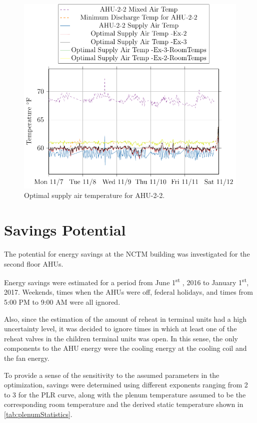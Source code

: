 \begin{figure}
\centering
\includegraphics[]{Plots/2016-11-16-1636-AHU22MixedAirTemp-TikzData.pdf}
\caption{Optimal supply air temperature for AHU-2-2.}
\label{fig:2016-11-16-1636-AHU22MixedAirTemp-TikzData}
\end{figure}

\section{Savings Potential}

The potential for energy savings at the NCTM building was investigated
for the second floor AHUs. 

Energy savings were estimated for a period from June
1\textsuperscript{st} , 2016 to January 1\textsuperscript{st}, 2017.
Weekends, times when the AHUs were off, federal holidays, and times from
5:00 PM to 9:00 AM were all ignored. 

Also, since the estimation of the amount of reheat in terminal
units had a high uncertainty level, it was decided to ignore times in
which at least one of the reheat valves in the children terminal units
was open. In this sense, the only components to the AHU energy were the
cooling energy at the cooling coil and the fan energy. 

To provide a sense of the sensitivity to the assumed parameters in the
optimization, savings were determined using different exponents ranging
from 2 to 3 for the PLR curve, along with the plenum temperature assumed
to be the corresponding room temperature and the derived static
temperature shown in \tableref{} \ref{tab:plenumStatistics}. 

